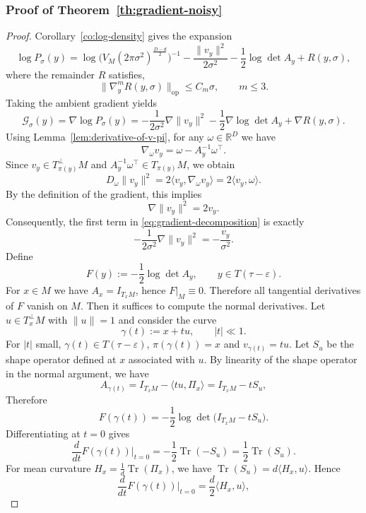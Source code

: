 \documentclass[11pt]{article}
\theoremstyle{plain}
\theoremstyle{definition}
\begin{document}
\subsubsection{Proof of Theorem~\ref{th:gradient-noisy}}\label{sec:pf-gradient noisy} 
\begin{proof}
Corollary~\ref{co:log-density} gives the expansion
\[
\log P_\sigma(y)
= \log \big(V_M(2\pi\sigma^2)^{\frac{D-d}{2}}\big)^{-1} - \frac{\|v_y\|^2}{2\sigma^2}
  - \frac{1}{2}\log\det A_y + R(y,\sigma),
\]
where the remainder $R$ satisfies,
\[
\|\nabla_y^m R(y,\sigma)\|_{\mathrm{op}}
\le C_{m}\sigma, \qquad m\le 3.
\]
Taking the ambient gradient yields
\begin{equation}\label{eq:gradient-decomposition}
\mathcal G_\sigma(y) = \nabla \log P_\sigma(y)
= - \frac{1}{2\sigma^2}\nabla\|v_y\|^2
  - \frac{1}{2}\nabla \log\det A_y + \nabla R(y,\sigma).
\end{equation}
Using Lemma~\ref{lem:derivative-of-v-pi}, for any $\omega \in \mathbb{R}^D$ we have
\[
\nabla_\omega v_y = \omega - A_y^{-1}\omega^\top.
\]
Since $v_y \in T_{\pi(y)}^\perp M$ and $A_y^{-1}\omega^\top \in T_{\pi(y)}M$, we obtain
\[
D_\omega \|v_y\|^2
= 2\langle v_y, \nabla_\omega v_y \rangle
= 2\langle v_y, \omega \rangle.
\]
By the definition of the gradient, this implies
\[
\nabla \|v_y\|^2 = 2 v_y.
\]
Consequently, the first term in \eqref{eq:gradient-decomposition} is exactly
\[
- \frac{1}{2\sigma^2}\nabla\|v_y\|^2 = - \frac{v_y}{\sigma^2}.
\]
Define
\[
F(y) := -\frac{1}{2}\log\det A_y, \qquad y \in T(\tau-\varepsilon).
\]
For $x\in M$ we have $A_x=I_{T_xM}$, hence $F|_M\equiv 0$. Therefore all tangential derivatives of $F$ vanish on $M$. Then it suffices to compute the normal derivatives. Let $u \in T_x^\perp M$ with $\|u\| = 1$ and consider the curve
\[
\gamma(t) := x + t u, \qquad |t| \ll 1.
\]
For $|t|$ small, $\gamma(t) \in T(\tau-\varepsilon)$, $\pi(\gamma(t)) = x$ and $v_{\gamma(t)} = t u$. Let $S_u$ be the shape operator defined at $x$ associated with $u$. By linearity of the shape operator in the normal argument, we have
\[
A_{\gamma(t)} = I_{T_xM} - \langle t u, \Pi_x \rangle
= I_{T_xM} - t S_u,
\]
Therefore
\[
F(\gamma(t)) = -\frac{1}{2}\log\det\big(I_{T_xM} - t S_u\big).
\]
Differentiating at $t=0$ gives
\[
\frac{d}{dt} F(\gamma(t))\Big|_{t=0}
= -\frac{1}{2}\operatorname{Tr}(-S_u)
= \frac{1}{2}\operatorname{Tr}(S_u).
\]
For mean curvature $H_x = \frac{1}{d}\operatorname{Tr}(\Pi_x)$, we have $\operatorname{Tr}(S_u) = d \langle H_x, u\rangle$. Hence
\[
\frac{d}{dt} F(\gamma(t))\Big|_{t=0}
= \frac{d}{2} \langle H_x, u\rangle,
\]
\end{proof}
\end{document}
